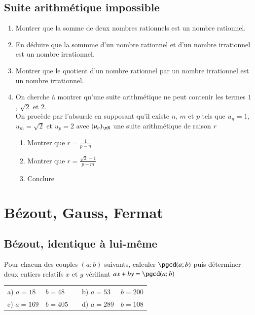 \documentclass[oneside,12pt]{article}          %
\begin{document}
\subsection{Suite arithmétique impossible}
\begin{enumerate}
    \item Montrer que la somme de deux nombres rationnels est un nombre rationnel.
    \item En déduire que la sommme d'un nombre rationnel et d'un nombre irrationnel est un nombre irrationnel.
    \item Montrer que le quotient d'un nombre rationnel par un nombre irrationnel est un nombre irrationnel.
    \item On cherche à montrer qu'une suite arithmétique ne peut contenir les termes $1$, $\sqrt{2}$ et 2.\\
    On procède par l'absurde en supposant qu'il existe $n$, $m$ et $p$ tels que $u_n=1$, $u_m=\sqrt{2}$ et $u_p=2$ avec $(u_n)_{\nN}$ une suite arithmétique de raison $r$
    \begin{enumerate}
        \item Montrer que $r=\frac{1}{p-n}$
        \item Montrer que $r=\frac{\sqrt{2}-1}{p-m}$
        \item Conclure
    \end{enumerate}
\end{enumerate}



\section{Bézout, Gauss, Fermat}

\subsection{Bézout, identique à lui-même}
Pour chacun des couples $(a;b)$ suivants, calculer $\pgcd(a;b)$ puis déterminer deux entiers relatifs $x$ et $y$ vérifiant $ax+by=\pgcd(a;b)$

\begin{tabular}{p{20mm}p{35mm}|p{15mm}p{30mm}p{30mm}}
     a) $a=18$ & $b=48$ & & b) $a=53$ & $b=200$ \\
     c) $a=169$ & $b=405$ & & d) $a=289$ & $b=108$
\end{tabular}
\end{document}
